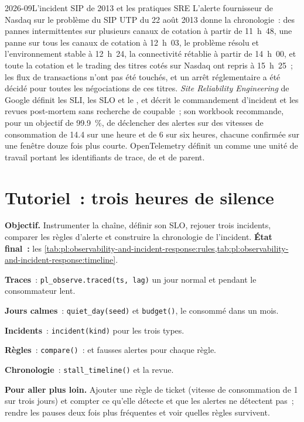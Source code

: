 \begin{dated}{2026-09}{L'incident SIP de 2013 et les pratiques SRE}\label{dat:pl:observability-and-incident-response:sip}
L'alerte fournisseur de Nasdaq sur le problème du SIP UTP du 22 août 2013 donne la chronologie~: des pannes intermittentes sur plusieurs canaux de cotation à partir de
11~h~48, une panne sur tous les canaux de cotation à 12~h~03, le problème résolu et l'environnement stable à 12~h~24, la connectivité rétablie à partir de
14~h~00, et toute la cotation et le trading des titres cotés sur Nasdaq ont repris à 15~h~25~; les flux de transactions n'ont pas été touchés, et un arrêt réglementaire a été
décidé pour toutes les négociations de ces titres. \emph{Site Reliability Engineering} de Google définit les SLI, les SLO et le , et décrit
le commandement d'incident et les revues post-mortem sans recherche de coupable~; son workbook recommande, pour un objectif de 99.9~\%, de déclencher des alertes sur des vitesses de consommation de 14.4 sur une heure et de 6
sur six heures, chacune confirmée sur une fenêtre douze fois plus courte. OpenTelemetry définit un  comme une unité de travail portant les identifiants de trace, de 
et de parent.
\end{dated}

\section{Tutoriel~: trois heures de silence}\label{tut:pl:observability-and-incident-response:tut}

\begin{tutorial}
\textbf{Objectif.} Instrumenter la chaîne, définir son SLO, rejouer trois incidents, comparer les règles d'alerte et construire la chronologie de l'incident.
\textbf{État final~:} les \cref{tab:pl:observability-and-incident-response:rules,tab:pl:observability-and-incident-response:timeline}.
\begin{tutsteps}
\item \textbf{Traces}~: \texttt{pl\_observe.traced(ts, lag)} un jour normal et pendant le consommateur lent.
\item \textbf{Jours calmes}~: \texttt{quiet\_day(seed)} et \texttt{budget()}, le  consommé dans un mois.
\item \textbf{Incidents}~: \texttt{incident(kind)} pour les trois types.
\item \textbf{Règles}~: \texttt{compare()}~:  et fausses alertes pour chaque règle.
\item \textbf{Chronologie}~: \texttt{stall\_timeline()} et la revue.
\end{tutsteps}
\textbf{Pour aller plus loin.} Ajouter une règle de ticket (vitesse de consommation de 1 sur trois jours) et compter ce qu'elle détecte et que les alertes ne détectent pas~; rendre les
pauses deux fois plus fréquentes et voir quelles règles survivent.
\end{tutorial}

